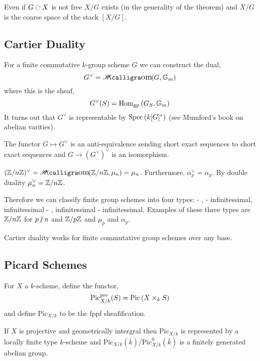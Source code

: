 \documentclass[12pt]{article}
\begin{document}
\begin{rmk}
Even if $G \acts X$ is not free $X/G$ exists (in the generality of the theorem) and $X/G$ is the coarse space of the stack $[X/G]$. 
\end{rmk}

\subsection{Cartier Duality}

For a finite commutative $k$-group scheme $G$ we can construct the dual,
\[ G^\vee = \shHom{}{G}{\Gm} \]
where this is the sheaf,
\[ G^\vee(S) = \mathrm{Hom}_{\text{gp}} \left( G_S, \mathbb{G}_m \right) \]
It turns out that $G^\vee$ is representable by $\mathrm{Spec}\left( k[G]^* \right)$ (see Mumford's book on abelian varities). 

\begin{thm}
The functor $G \mapsto G^\vee$ is an anti-equivalence sending short exact sequences to short exact sequences and $G \to (G^\vee)^\vee$ is an isomorphism.
\end{thm}

\begin{example}
$(\Z / n \Z)^\vee = \shHom{}{\Z / n \Z}{\mu_n} = \mu_n$. Furthermore, $\alpha_p^\vee = \alpha_p$. By double duality $\mu_n^\vee = \mathbb{Z} / n \mathbb{Z}$.
\end{example}

\begin{rmk}
Therefore we can classify finite group schemes into four types: \etale - \etale, \etale - infinitessimal, infinitessimal - \etale, infinitessimal - infinitessimal. Examples of these three types are $\mathbb{Z} / n \mathbb{Z}$ for $p \ndivides n$ and $\mathbb{Z} / p \mathbb{Z}$ and $\mu_p$ and $\alpha_p$.
\end{rmk}

\begin{rmk}
Cartier duality works for finite commutative group schemes over any base.
\end{rmk}

\subsection{Picard Schemes}

For $X$ a $k$-scheme, define the functor,
\[ \mathrm{Pic}^{\text{pre}}_{X/k}(S) = \mathrm{Pic} \left( X \times_k S \right) \]
and define $\mathrm{Pic}_{X/k}$ to be the fppf sheafification. 

\begin{thm}
If $X$ is projective and geometrically intergral then $\mathrm{Pic}_{X/k}$ is represented by a locally finite type $k$-scheme and $\mathrm{Pic}_{X/k}(\bar{k}) / \mathrm{Pic}^0_{X/k}(\bar{k})$ is a finitely generated abelian group. 
\end{thm}
\end{document}
